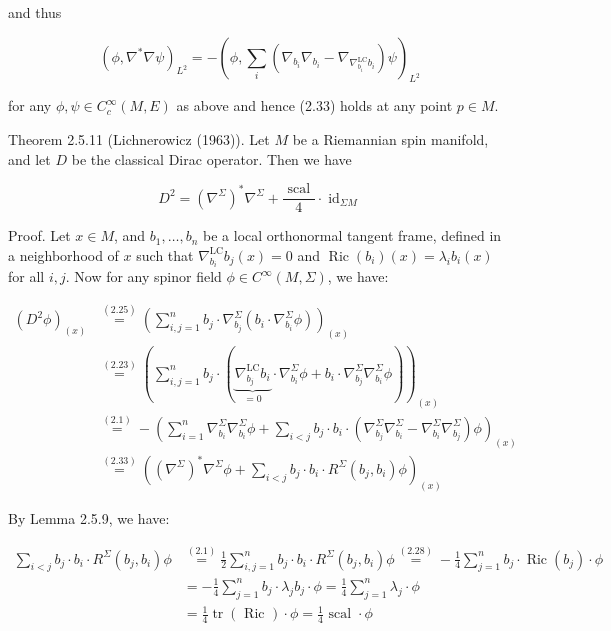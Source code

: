 \documentclass[10pt, letterpaper]{article}
\begin{document}
and thus

$$
\left(\phi, \nabla^{*} \nabla \psi\right)_{L^{2}}=-\left(\phi, \sum_{i}\left(\nabla_{b_{i}} \nabla_{b_{i}}-\nabla_{\nabla_{b_{i}}^{\mathrm{LC}} b_{i}}\right) \psi\right)_{L^{2}}
$$

for any $\phi, \psi \in C_{c}^{\infty}(M, E)$ as above and hence (2.33) holds at any point $p \in M$.

Theorem 2.5.11 (Lichnerowicz (1963)). Let $M$ be a Riemannian spin manifold, and let $D$ be the classical Dirac operator. Then we have

$$
D^{2}=\left(\nabla^{\Sigma}\right)^{*} \nabla^{\Sigma}+\frac{\text { scal }}{4} \cdot \operatorname{id}_{\Sigma M}
$$

Proof. Let $x \in M$, and $b_{1}, \ldots, b_{n}$ be a local orthonormal tangent frame, defined in a neighborhood of $x$ such that $\nabla_{b_{i}}^{\mathrm{LC}} b_{j}(x)=0$ and $\operatorname{Ric}\left(b_{i}\right)(x)=\lambda_{i} b_{i}(x)$ for all $i, j$. Now for any spinor field $\phi \in C^{\infty}(M, \Sigma)$, we have:

$$
\begin{aligned}
\left(D^{2} \phi\right)_{(x)} & \stackrel{(2.25)}{=}\left(\sum_{i, j=1}^{n} b_{j} \cdot \nabla_{b_{j}}^{\Sigma}\left(b_{i} \cdot \nabla_{b_{i}}^{\Sigma} \phi\right)\right)_{(x)} \\
& \stackrel{(2.23)}{=}(\sum_{i, j=1}^{n} b_{j} \cdot(\underbrace{\nabla_{b_{j}}^{\mathrm{LC}} b_{i}}_{=0} \cdot \nabla_{b_{i}}^{\Sigma} \phi+b_{i} \cdot \nabla_{b_{j}}^{\Sigma} \nabla_{b_{i}}^{\Sigma} \phi))_{(x)} \\
& \stackrel{(2.1)}{=}-\left(\sum_{i=1}^{n} \nabla_{b_{i}}^{\Sigma} \nabla_{b_{i}}^{\Sigma} \phi+\sum_{i<j} b_{j} \cdot b_{i} \cdot\left(\nabla_{b_{j}}^{\Sigma} \nabla_{b_{i}}^{\Sigma}-\nabla_{b_{i}}^{\Sigma} \nabla_{b_{j}}^{\Sigma}\right) \phi\right)_{(x)} \\
& \stackrel{(2.33)}{=}\left(\left(\nabla^{\Sigma}\right)^{*} \nabla^{\Sigma} \phi+\sum_{i<j} b_{j} \cdot b_{i} \cdot R^{\Sigma}\left(b_{j}, b_{i}\right) \phi\right)_{(x)}
\end{aligned}
$$

By Lemma 2.5.9, we have:

$$
\begin{aligned}
\sum_{i<j} b_{j} \cdot b_{i} \cdot R^{\Sigma}\left(b_{j}, b_{i}\right) \phi & \stackrel{(2.1)}{=} \frac{1}{2} \sum_{i, j=1}^{n} b_{j} \cdot b_{i} \cdot R^{\Sigma}\left(b_{j}, b_{i}\right) \phi \stackrel{(2.28)}{=}-\frac{1}{4} \sum_{j=1}^{n} b_{j} \cdot \operatorname{Ric}\left(b_{j}\right) \cdot \phi \\
& =-\frac{1}{4} \sum_{j=1}^{n} b_{j} \cdot \lambda_{j} b_{j} \cdot \phi=\frac{1}{4} \sum_{j=1}^{n} \lambda_{j} \cdot \phi \\
& =\frac{1}{4} \operatorname{tr}(\text { Ric }) \cdot \phi=\frac{1}{4} \text { scal } \cdot \phi
\end{aligned}
$$
\end{document}
